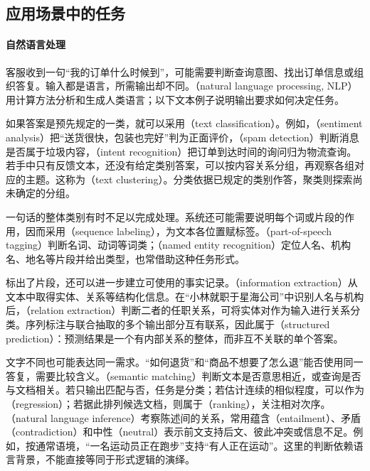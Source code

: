 \subsection{应用场景中的任务}

\paragraph{自然语言处理}
客服收到一句“我的订单什么时候到”，可能需要判断查询意图、找出订单信息或组织答复。输入都是语言，所需输出却不同。（natural language processing, NLP）用计算方法分析和生成人类语言；以下文本例子说明输出要求如何决定任务。

如果答案是预先规定的一类，就可以采用（text classification）。例如，（sentiment analysis）把“送货很快，包装也完好”判为正面评价，（spam detection）判断消息是否属于垃圾内容，（intent recognition）把订单到达时间的询问归为物流查询。若手中只有反馈文本，还没有给定类别答案，可以按内容关系分组，再观察各组对应的主题。这称为（text clustering）。分类依据已规定的类别作答，聚类则探索尚未确定的分组。

一句话的整体类别有时不足以完成处理。系统还可能需要说明每个词或片段的作用，因而采用（sequence labeling），为文本各位置赋标签。（part-of-speech tagging）判断名词、动词等词类；（named entity recognition）定位人名、机构名、地名等片段并给出类型，也常借助这种任务形式。

标出了片段，还可以进一步建立可使用的事实记录。（information extraction）从文本中取得实体、关系等结构化信息。在“小林就职于星海公司”中识别人名与机构后，（relation extraction）判断二者的任职关系，可将实体对作为输入进行关系分类。序列标注与联合抽取的多个输出部分互有联系，因此属于（structured prediction）：预测结果是一个有内部关系的整体，而非互不关联的单个答案。

文字不同也可能表达同一需求。“如何退货”和“商品不想要了怎么退”能否使用同一答复，需要比较含义。（semantic matching）判断文本是否意思相近，或查询是否与文档相关。若只输出匹配与否，任务是分类；若估计连续的相似程度，可以作为（regression）；若据此排列候选文档，则属于（ranking），关注相对次序。（natural language inference）考察陈述间的关系，常用蕴含（entailment）、矛盾（contradiction）和中性（neutral）表示前文支持后文、彼此冲突或信息不足。例如，按通常语境，“一名运动员正在跑步”支持“有人正在运动”。这里的判断依赖语言背景，不能直接等同于形式逻辑的演绎。

